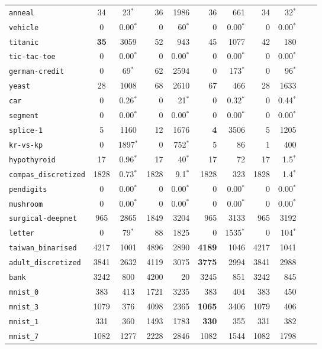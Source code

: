 \begin{tabular}{lccrrrrrrrr}
\texttt{anneal} & 34 & 23$^*$ & 36 & 1986 & 36 & 661 & 34 & 32$^*$\\
\texttt{vehicle} & 0 & 0.00$^*$ & 0 & 60$^*$ & 0 & 0.00$^*$ & 0 & 0.00$^*$\\
\texttt{titanic} & \textbf{35} & 3059 & 52 & 943 & 45 & 1077 & 42 & 180\\
\texttt{tic-tac-toe} & 0 & 0.00$^*$ & 0 & 0.00$^*$ & 0 & 0.00$^*$ & 0 & 0.00$^*$\\
\texttt{german-credit} & 0 & 69$^*$ & 62 & 2594 & 0 & 173$^*$ & 0 & 96$^*$\\
\texttt{yeast} & 28 & 1008 & 68 & 2610 & 67 & 466 & 28 & 1633\\
\texttt{car} & 0 & 0.26$^*$ & 0 & 21$^*$ & 0 & 0.32$^*$ & 0 & 0.44$^*$\\
\texttt{segment} & 0 & 0.00$^*$ & 0 & 0.00$^*$ & 0 & 0.00$^*$ & 0 & 0.00$^*$\\
\texttt{splice-1} & 5 & 1160 & 12 & 1676 & \textbf{4} & 3506 & 5 & 1205\\
\texttt{kr-vs-kp} & 0 & 1897$^*$ & 0 & 752$^*$ & 5 & 86 & 1 & 400\\
\texttt{hypothyroid} & 17 & 0.96$^*$ & 17 & 40$^*$ & 17 & 72 & 17 & 1.5$^*$\\
\texttt{compas\_discretized} & 1828 & 0.73$^*$ & 1828 & 9.1$^*$ & 1828 & 323 & 1828 & 1.4$^*$\\
\texttt{pendigits} & 0 & 0.00$^*$ & 0 & 0.00$^*$ & 0 & 0.00$^*$ & 0 & 0.00$^*$\\
\texttt{mushroom} & 0 & 0.00$^*$ & 0 & 0.00$^*$ & 0 & 0.00$^*$ & 0 & 0.00$^*$\\
\texttt{surgical-deepnet} & 965 & 2865 & 1849 & 3204 & 965 & 3133 & 965 & 3192\\
\texttt{letter} & 0 & 79$^*$ & 88 & 1825 & 0 & 1535$^*$ & 0 & 104$^*$\\
\texttt{taiwan\_binarised} & 4217 & 1001 & 4896 & 2890 & \textbf{4189} & 1046 & 4217 & 1041\\
\texttt{adult\_discretized} & 3841 & 2632 & 4119 & 3075 & \textbf{3775} & 2994 & 3841 & 2988\\
\texttt{bank} & 3242 & 800 & 4200 & 20 & 3245 & 851 & 3242 & 845\\
\texttt{mnist\_0} & 383 & 413 & 1721 & 3235 & 383 & 404 & 383 & 450\\
\texttt{mnist\_3} & 1079 & 376 & 4098 & 2365 & \textbf{1065} & 3406 & 1079 & 406\\
\texttt{mnist\_1} & 331 & 360 & 1493 & 1783 & \textbf{330} & 355 & 331 & 382\\
\texttt{mnist\_7} & 1082 & 1277 & 2228 & 2846 & 1082 & 1544 & 1082 & 1798\\

\end{tabular}
